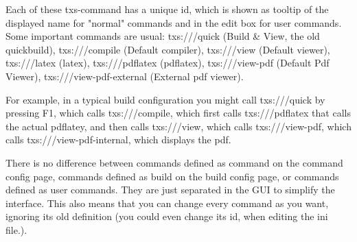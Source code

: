 \documentclass{article}
\begin{document}
	Each of these txs-command has a unique id, which is shown as tooltip of the displayed name for "normal" commands and in the edit box for user commands. Some important commands are usual: txs:///quick (Build \& View, the old quickbuild), txs:///compile (Default compiler), txs:///view (Default viewer), txs:///latex (latex), txs:///pdflatex (pdflatex), txs:///view-pdf (Default Pdf Viewer), txs:///view-pdf-external (External pdf viewer).
	
	For example, in a typical build configuration you might call txs:///quick by pressing F1, which calls txs:///compile, which first calls txs:///pdflatex that calls the actual pdflatey, and then calls txs:///view, which calls txs:///view-pdf, which calls txs:///view-pdf-internal, which displays the pdf.
	
	There is no difference between commands defined as command on the command config page, commands defined as build on the build config page, or commands defined as user commands. They are just separated in the GUI to simplify the interface.
	This also means that you can change every command as you want, ignoring its old definition (you could even change its id, when editing the ini file.).
	
	
	
\end{document}
